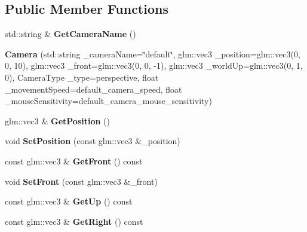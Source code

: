 \subsection*{Public Member Functions}
\begin{DoxyCompactItemize}
\item 
\mbox{\label{classpiolot_1_1_camera_ae4322f03375c71eae72b7238a1c4ac12}} 
std\+::string \& {\bfseries Get\+Camera\+Name} ()
\item 
\mbox{\label{classpiolot_1_1_camera_a7c525f53bc93d1627261d40674e96104}} 
{\bfseries Camera} (std\+::string \+\_\+camera\+Name=\char`\"{}default\char`\"{}, glm\+::vec3 \+\_\+position=glm\+::vec3(0, 0, 10), glm\+::vec3 \+\_\+front=glm\+::vec3(0, 0, -\/1), glm\+::vec3 \+\_\+world\+Up=glm\+::vec3(0, 1, 0), Camera\+Type \+\_\+type=perspective, float \+\_\+movement\+Speed=default\+\_\+camera\+\_\+speed, float \+\_\+mouse\+Sensitivity=default\+\_\+camera\+\_\+mouse\+\_\+sensitivity)
\item 
\mbox{\label{classpiolot_1_1_camera_a9c12125ca134fdf776a296c0fac4a79f}} 
glm\+::vec3 \& {\bfseries Get\+Position} ()
\item 
\mbox{\label{classpiolot_1_1_camera_a84ff7b1edc39841dddc485fb9e641bf1}} 
void {\bfseries Set\+Position} (const glm\+::vec3 \&\+\_\+position)
\item 
\mbox{\label{classpiolot_1_1_camera_a6a428b0f65c9f2b3b5c5c028a96fb1f7}} 
const glm\+::vec3 \& {\bfseries Get\+Front} () const
\item 
\mbox{\label{classpiolot_1_1_camera_a6151125f42016135376a60182acb63ef}} 
void {\bfseries Set\+Front} (const glm\+::vec3 \&\+\_\+front)
\item 
\mbox{\label{classpiolot_1_1_camera_a9ce10517ad9161abf65b827d1884d785}} 
const glm\+::vec3 \& {\bfseries Get\+Up} () const
\item 
\mbox{\label{classpiolot_1_1_camera_a970d1203b54bb2323f9cbb994366d3b4}} 
const glm\+::vec3 \& {\bfseries Get\+Right} () const
\item 

\end{DoxyCompactItemize}
